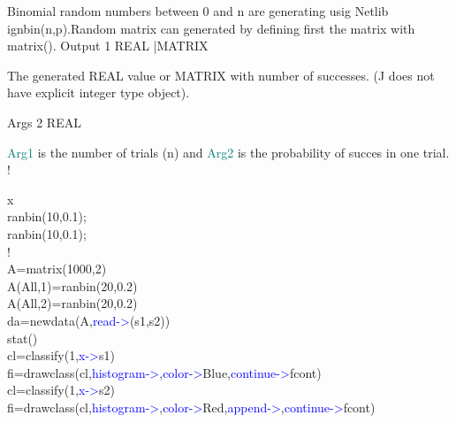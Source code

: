 \begin{itemize}
Binomial random numbers between 0 and n are generating usig Netlib
ignbin(n,p).Random matrix can generated by defining first
the matrix with \textcolor{VioletRed}{matrix}().
\vspace{0.3cm}
\hline
\vspace{0.3cm}
\noindent Output \tabto{3cm}  1 \tabto{5cm}   REAL |MATRIX   \tabto{7cm}
\begin{changemargin}{3cm}{0cm}
\noindent  The generated REAL value or MATRIX with
number of successes. (J does not have explicit integer type object).
\end{changemargin}
\vspace{0.3cm}
\hline
\vspace{0.3cm}
\noindent Args  \tabto{3cm} 2 \tabto{5cm}  REAL \tabto{7cm}
\begin{changemargin}{3cm}{0cm}
\noindent  \textcolor{teal}{Arg1} is the number of trials (n) and \textcolor{teal}{Arg2} is the probability
of succes in one trial.
!
\end {changemargin}
\hline
\vspace{0.2cm}
\begin{example}[ranbinex]x\\
\label{ranbinex}
\textcolor{VioletRed}{ranbin}(10,0.1);
\\
\textcolor{VioletRed}{ranbin}(10,0.1);\\
!\\
A=\textcolor{VioletRed}{matrix}(1000,2)\\
A(All,1)=\textcolor{VioletRed}{ranbin}(20,0.2)\\
A(All,2)=\textcolor{VioletRed}{ranbin}(20,0.2)\\
da=\textcolor{VioletRed}{newdata}(A,\textcolor{blue}{read->}(s1,s2))\\
\textcolor{VioletRed}{stat}()\\
cl=\textcolor{VioletRed}{classify}(1,\textcolor{blue}{x->}s1)\\
fi=\textcolor{VioletRed}{drawclass}(cl,\textcolor{blue}{histogram->},\textcolor{blue}{color->}Blue,\textcolor{blue}{continue->}fcont)\\
cl=\textcolor{VioletRed}{classify}(1,\textcolor{blue}{x->}s2)\\
fi=\textcolor{VioletRed}{drawclass}(cl,\textcolor{blue}{histogram->},\textcolor{blue}{color->}Red,\textcolor{blue}{append->},\textcolor{blue}{continue->}fcont)
\end{example}


\end{itemize}
